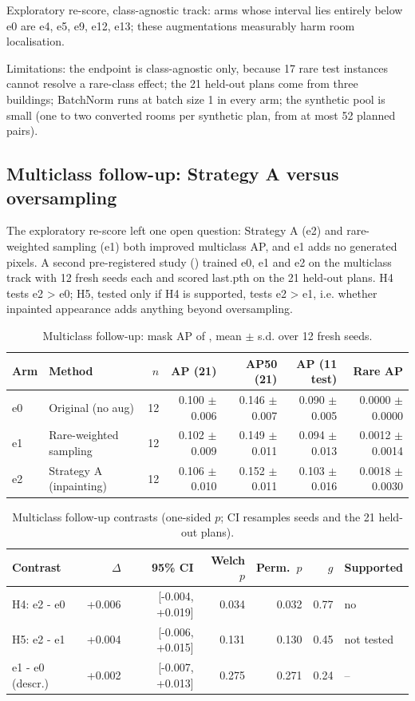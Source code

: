 Exploratory re-score, class-agnostic track: arms whose interval lies entirely below e0 are e4, e5, e9, e12, e13; these augmentations measurably harm room localisation.

Limitations: the endpoint is class-agnostic only, because 17 rare test instances cannot resolve a rare-class effect; the 21 held-out plans come from three buildings; BatchNorm runs at batch size 1 in every arm; the synthetic pool is small (one to two converted rooms per synthetic plan, from at most 52 planned pairs).

\subsection{Multiclass follow-up: Strategy A versus oversampling}
\label{sec:confirmmc}

The exploratory re-score left one open question: Strategy A (e2) and rare-weighted sampling (e1) both improved multiclass AP, and e1 adds no generated pixels. A second pre-registered study () trained e0, e1 and e2 on the multiclass track with 12 fresh seeds each and scored last.pth on the 21 held-out plans. H4 tests e2 > e0; H5, tested only if H4 is supported, tests e2 > e1, i.e. whether inpainted appearance adds anything beyond oversampling.

\begin{table}[H]
\centering
\caption{Multiclass follow-up: mask AP of , mean $\pm$ s.d. over 12 fresh seeds.}
\label{tab:confirmmc}
\small
\begin{tabular}{@{}llrrrrr@{}}
\toprule
Arm & Method & $n$ & AP (21) & AP50 (21) & AP (11 test) & Rare AP \\
\midrule
e0 & Original (no aug) & 12 & 0.100 $\pm$ 0.006 & 0.146 $\pm$ 0.007 & 0.090 $\pm$ 0.005 & 0.0000 $\pm$ 0.0000 \\
e1 & Rare-weighted sampling & 12 & 0.102 $\pm$ 0.009 & 0.149 $\pm$ 0.011 & 0.094 $\pm$ 0.013 & 0.0012 $\pm$ 0.0014 \\
e2 & Strategy A (inpainting) & 12 & 0.106 $\pm$ 0.010 & 0.152 $\pm$ 0.011 & 0.103 $\pm$ 0.016 & 0.0018 $\pm$ 0.0030 \\
\bottomrule
\end{tabular}
\end{table}

\begin{table}[H]
\centering
\caption{Multiclass follow-up contrasts (one-sided $p$; CI resamples seeds and the 21 held-out plans).}
\label{tab:confirmmctests}
\small
\begin{tabular}{@{}lrrrrrl@{}}
\toprule
Contrast & $\Delta$ & 95\% CI & Welch $p$ & Perm.\ $p$ & $g$ & Supported \\
\midrule
H4: e2 - e0 & +0.006 & [-0.004, +0.019] & 0.034 & 0.032 & 0.77 & no \\
H5: e2 - e1 & +0.004 & [-0.006, +0.015] & 0.131 & 0.130 & 0.45 & not tested \\
e1 - e0 (descr.) & +0.002 & [-0.007, +0.013] & 0.275 & 0.271 & 0.24 & -- \\
\bottomrule
\end{tabular}
\end{table}

